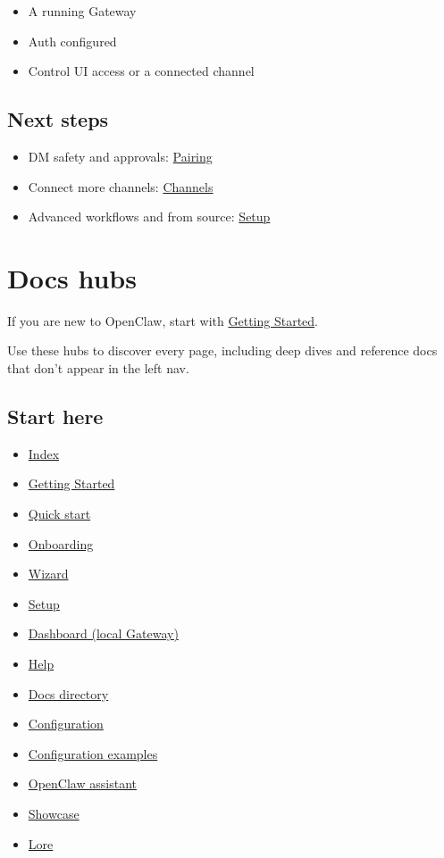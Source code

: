 \begin{itemize}
  \item A running Gateway
  \item Auth configured
  \item Control UI access or a connected channel
\end{itemize}


\subsection{Next steps}


\begin{itemize}
  \item DM safety and approvals: \href{/channels/pairing}{Pairing}
  \item Connect more channels: \href{/channels}{Channels}
  \item Advanced workflows and from source: \href{/start/setup}{Setup}
\end{itemize}



\clearpage

\section{Docs hubs}


If you are new to OpenClaw, start with \href{/start/getting-started}{Getting Started}.

Use these hubs to discover every page, including deep dives and reference docs that don’t appear in the left nav.

\subsection{Start here}


\begin{itemize}
  \item \href{/}{Index}
  \item \href{/start/getting-started}{Getting Started}
  \item \href{/start/quickstart}{Quick start}
  \item \href{/start/onboarding}{Onboarding}
  \item \href{/start/wizard}{Wizard}
  \item \href{/start/setup}{Setup}
  \item \href{http://127.0.0.1:18789/}{Dashboard (local Gateway)}
  \item \href{/help}{Help}
  \item \href{/start/docs-directory}{Docs directory}
  \item \href{/gateway/configuration}{Configuration}
  \item \href{/gateway/configuration-examples}{Configuration examples}
  \item \href{/start/openclaw}{OpenClaw assistant}
  \item \href{/start/showcase}{Showcase}
  \item \href{/start/lore}{Lore}
\end{itemize}


